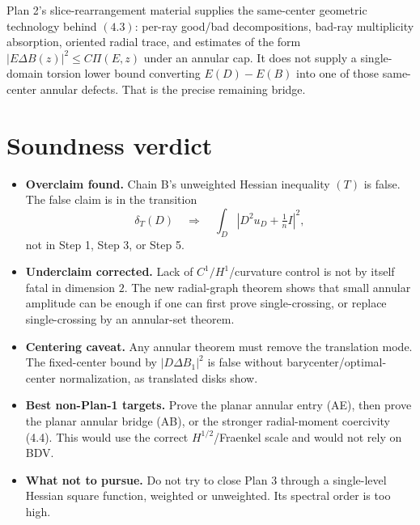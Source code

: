 \documentclass[11pt]{article}
\begin{document}
Plan 2's slice-rearrangement material supplies the same-center geometric
technology behind \((4.3)\): per-ray good/bad decompositions, bad-ray
multiplicity absorption, oriented radial trace, and estimates of the form
\(|E\Delta B(z)|^2\le C\Pi(E,z)\) under an annular cap.  It does not supply a
single-domain torsion lower bound converting \(E(D)-E(B)\) into one of those
same-center annular defects.  That is the precise remaining bridge.

\section{Soundness verdict}

\begin{itemize}
\item \textbf{Overclaim found.}  Chain B's unweighted Hessian inequality
\((T)\) is false.  The false claim is in the transition
\[
   \delta_T(D)\quad\Longrightarrow\quad
   \int_D|D^2u_D+\tfrac1n I|^2,
\]
not in Step 1, Step 3, or Step 5.
\item \textbf{Underclaim corrected.}  Lack of \(C^1/H^1\)/curvature control
is not by itself fatal in dimension \(2\).  The new radial-graph theorem
shows that small annular amplitude can be enough if one can first prove
single-crossing, or replace single-crossing by an annular-set theorem.
\item \textbf{Centering caveat.}  Any annular theorem must remove the
translation mode.  The fixed-center bound by \(|D\Delta B_1|^2\) is false
without barycenter/optimal-center normalization, as translated disks show.
\item \textbf{Best non-Plan-1 targets.}  Prove the planar annular entry
(AE), then prove the planar annular bridge (AB), or the stronger
radial-moment coercivity (4.4).  This would use the correct
\(H^{1/2}\)/Fraenkel scale and would not rely on BDV.
\item \textbf{What not to pursue.}  Do not try to close Plan 3 through a
single-level Hessian square function, weighted or unweighted.  Its spectral
order is too high.
\end{itemize}
\end{document}
